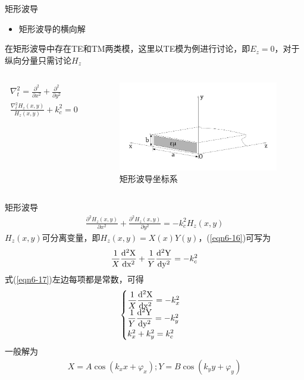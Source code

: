 \begin{frame}{矩形波导}
    \begin{itemize}
        \item 矩形波导的横向解
    \end{itemize}
    在矩形波导中存在TE和TM两类模，这里以TE模为例进行讨论，即$E_z=0$，对于纵向分量只需讨论$H_z$
    \begin{columns}
        \begin{column}{0.4\linewidth}
            \begin{align*}
                \nabla_t^2=\frac{\partial^2}{\partial x^2}+\frac{\partial^2}{\partial y^2} \\
                \frac{\nabla_t^2H_z(x,y)}{H_z(x,y)}+k_c^2=0
            \end{align*}
        \end{column}
        \begin{column}{0.6\linewidth}
            \begin{figure}
                \includegraphics[width=7cm]{Cha6//fig6-3.pdf}
                \caption{矩形波导坐标系}
            \end{figure}
        \end{column}
    \end{columns}
\end{frame}

\begin{frame}{矩形波导}
    \begin{align}
        \frac{\partial^2H_z(x,y)}{\partial x^2}+\frac{\partial^2H_z(x,y)}{\partial y^2}=-k_c^2H_z(x,y)
        \label{eqn6-16}
    \end{align}
    $H_z(x,y)$可分离变量，即$H_z(x,y)=X(x)Y(y)$，(\ref{eqn6-16})可写为
    \begin{align}
        \frac{1}{X}\frac{\rm{d}^2X}{\rm{d}x^2}+\frac{1}{Y}\frac{\rm{d}^2Y}{\rm{d}y^2}=-k_c^2
        \label{eqn6-17}
    \end{align}
    式(\ref{eqn6-17})左边每项都是常数，可得
    \begin{align}
        \begin{cases}
            \dfrac{1}{X}\dfrac{\rm{d}^2X}{\rm{d}x^2}=-k_x^2 \\
            \dfrac{1}{Y}\dfrac{\rm{d}^2Y}{\rm{d}y^2}=-k_y^2 \\
            k_x^2+k_y^2=k_c^2
        \end{cases}
    \end{align}
    一般解为
    \begin{align*}
        X=A\cos(k_x x+\varphi_x);Y=B\cos(k_y y+\varphi_y)
    \end{align*}

\end{frame}

